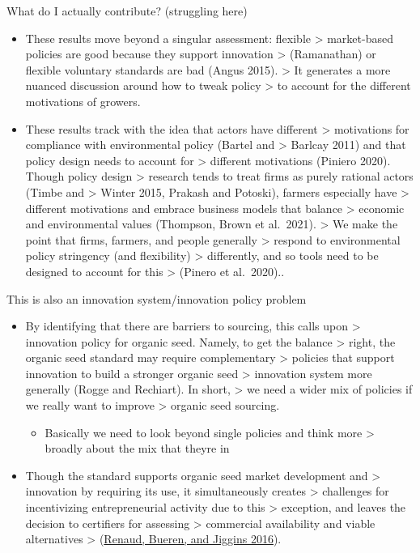 \documentclass[twoside,12pt,final]{ucthesis-CA2012}
\providecommand{\tightlist}{%
  \setlength{\itemsep}{0pt}\setlength{\parskip}{0pt}}
\begin{document}
\begin{ucmainmatter}
What do I actually contribute? (struggling here)
\begin{itemize}
\item
  These results move beyond a singular assessment: flexible
  \textgreater{} market-based policies are good because they support innovation
  \textgreater{} (Ramanathan) or flexible voluntary standards are bad (Angus 2015).
  \textgreater{} It generates a more nuanced discussion around how to tweak policy
  \textgreater{} to account for the different motivations of growers.
\item
  These results track with the idea that actors have different
  \textgreater{} motivations for compliance with environmental policy (Bartel and
  \textgreater{} Barlcay 2011) and that policy design needs to account for
  \textgreater{} different motivations (Piniero 2020). Though policy design
  \textgreater{} research tends to treat firms as purely rational actors (Timbe and
  \textgreater{} Winter 2015, Prakash and Potoski), farmers especially have
  \textgreater{} different motivations and embrace business models that balance
  \textgreater{} economic and environmental values (Thompson, Brown et al.~2021).
  \textgreater{} We make the point that firms, farmers, and people generally
  \textgreater{} respond to environmental policy stringency (and flexibility)
  \textgreater{} differently, and so tools need to be designed to account for this
  \textgreater{} (Pinero et al.~2020)..
\end{itemize}
This is also an innovation system/innovation policy problem
\begin{itemize}
\item
  By identifying that there are barriers to sourcing, this calls upon
  \textgreater{} innovation policy for organic seed. Namely, to get the balance
  \textgreater{} right, the organic seed standard may require complementary
  \textgreater{} policies that support innovation to build a stronger organic seed
  \textgreater{} innovation system more generally (Rogge and Rechiart). In short,
  \textgreater{} we need a wider mix of policies if we really want to improve
  \textgreater{} organic seed sourcing.
  \begin{itemize}
  \tightlist
  \item
    Basically we need to look beyond single policies and think more
    \textgreater{} broadly about the mix that they\textquotesingle re in
  \end{itemize}
\item
  Though the standard supports organic seed market development and
  \textgreater{} innovation by requiring its use, it simultaneously creates
  \textgreater{} challenges for incentivizing entrepreneurial activity due to this
  \textgreater{} exception, and leaves the decision to certifiers for assessing
  \textgreater{} commercial availability and viable alternatives
  \textgreater{} (\protect\hyperlink{ref-Renaud_Bueren_Jiggins_2016}{Renaud, Bueren, and Jiggins 2016}).
\end{itemize}
\hypertarget{reckoning-with-identities-of-environmental-movements}{%
}
\end{ucmainmatter}
\end{document}
